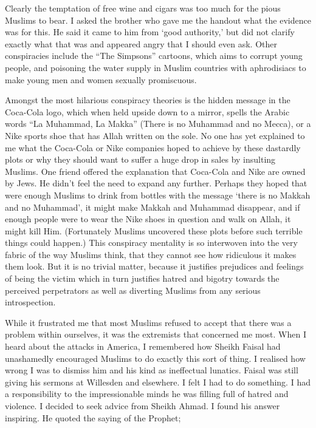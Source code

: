 \documentclass[12pt]{memoir}
\begin{document}
Clearly the temptation of free wine and cigars
was too much for the pious Muslims to bear.
I asked the brother who gave me the handout what the evidence was for this.
He said it came to him from ‘good authority,’
but did not clarify exactly what that was
and appeared angry that I should even ask.
Other conspiracies include the “The Simpsons” cartoons,
which aims to corrupt young people, and poisoning the water supply
in Muslim countries with aphrodisiacs
to make young men and women sexually promiscuous.

Amongst the most hilarious conspiracy theories
is the hidden message in the Coca-Cola logo,
which when held upside down to a mirror,
spells the Arabic words “La Muhammad, La Makka”
(There is no Muhammad and no Mecca),
or a Nike sports shoe that has Allah written on the sole.
No one has yet explained to me what the Coca-Cola or Nike companies
hoped to achieve by these dastardly plots
or why they should want to suffer a huge drop in sales by insulting Muslims.
One friend offered the explanation that Coca-Cola and Nike are owned by Jews.
He didn’t feel the need to expand any further.
Perhaps they hoped that\cor{}{,} were enough Muslims to drink from bottles
with the message ‘there is no Makkah and no Muhammad’,
it might make Makkah and Muhammad disappear,
and if enough people were to wear the Nike shoes
in question and walk on Allah, it might kill Him.
(Fortunately Muslims uncovered these plots
before such terrible things could happen.)
This conspiracy mentality is so interwoven
into the very fabric of the way Muslims think,
that they cannot see how ridiculous it makes them look.
But it is no trivial matter, because it justifies prejudices and feelings
of being the victim which in turn justifies hatred and bigotry
towards the perceived perpetrators as well as diverting Muslims
from any serious introspection.

While it frustrated me that most Muslims refused to accept
that there was a problem within ourselves,
it was the extremists that concerned me most.
When I heard about the attacks in America,
I remembered how Sheikh Faisal had unashamedly encouraged Muslims
to do exactly this sort of thing.
I realised how wrong I was to dismiss him
and his kind as ineffectual lunatics.
Faisal was still giving his sermons at Willesden and elsewhere.
I felt I had to do something.
I had a responsibility to the impressionable minds
he was filling full of hatred and violence.
I decided to seek advice from Sheikh Ahmad.
I found his answer inspiring.
He quoted the saying of the Prophet;
\end{document}

